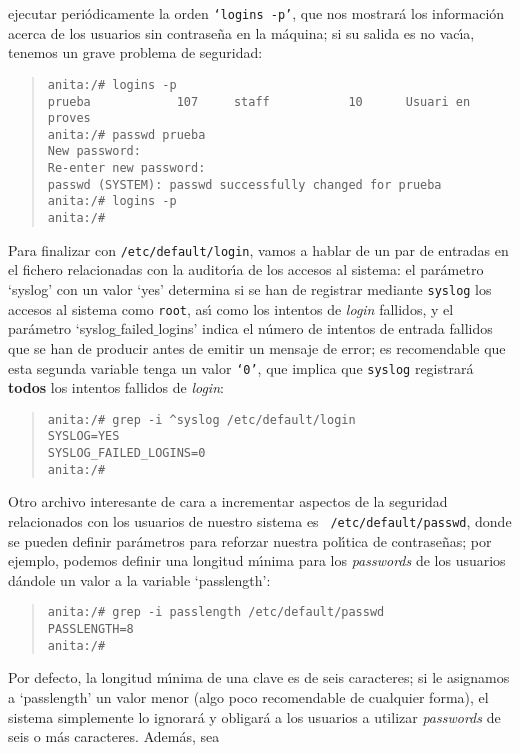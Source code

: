 ejecutar pe\-ri\'o\-di\-ca\-men\-te la orden {\tt `logins -p'}, que nos 
mostrar\'a los informaci\'on acerca de los usuarios sin contrase\~na en la
m\'aquina; si su salida es no vac\'{\i}a, tenemos un grave problema de 
seguridad:
\begin{quote}
\begin{verbatim}
anita:/# logins -p
prueba            107     staff           10      Usuari en proves
anita:/# passwd prueba
New password: 
Re-enter new password: 
passwd (SYSTEM): passwd successfully changed for prueba
anita:/# logins -p
anita:/# 
\end{verbatim}
\end{quote}
Para finalizar con {\tt /etc/default/login}, vamos a hablar de un par de
entradas en el fichero relacionadas con la auditor\'{\i}a de los accesos al
sistema: el par\'ametro {\sc `syslog'} con un valor {\sc `yes'} determina si se 
han de registrar mediante {\tt syslog} los accesos al sistema como {\tt root}, 
as\'{\i} como los intentos de {\it login} fallidos, y el par\'ametro {\sc
`syslog$\_$failed$\_$logins'} indica el n\'umero de intentos de entrada 
fallidos que se han de producir antes de emitir un mensaje de error; es 
recomendable que esta segunda variable tenga un valor {\tt `0'}, que implica
que {\tt syslog} registrar\'a {\bf todos} los intentos fallidos de {\it login}:
\begin{quote}
\begin{verbatim}
anita:/# grep -i ^syslog /etc/default/login 
SYSLOG=YES
SYSLOG_FAILED_LOGINS=0
anita:/# 
\end{verbatim}
\end{quote}
Otro archivo interesante de cara a incrementar aspectos de la seguridad 
relacionados con los u\-sua\-rios de nuestro sistema es {\tt
/etc/default/passwd}, donde se pueden definir par\'ametros para reforzar nuestra
pol\'{\i}tica de contrase\~nas; por ejemplo, podemos definir una longitud 
m\'{\i}nima para los {\it passwords} de los usuarios d\'andole un valor a la 
variable {\sc `passlength'}:
\begin{quote}
\begin{verbatim}
anita:/# grep -i passlength /etc/default/passwd 
PASSLENGTH=8
anita:/#
\end{verbatim}
\end{quote}
Por defecto, la longitud m\'{\i}nima de una clave es de seis caracteres; si le
asignamos a {\sc `passlength'} un valor menor (algo poco recomendable de 
cualquier forma), el sistema simplemente lo ignorar\'a y obligar\'a a los 
usuarios a utilizar {\it passwords} de seis o m\'as caracteres. Adem\'as, sea

